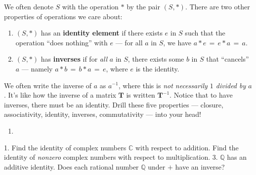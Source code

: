 \documentclass[11pt]{article}
\newcommand{\mat}[1]{\mathbf{#1}}
\begin{document}
We often denote $S$ with the operation $\ast$ by the pair $(S, \ast)$. There are two other properties of operations we care about:
\begin{enumerate}
  \item $(S, \ast)$ has an \textbf{identity element} if there exists $e$ in $S$ such that the operation ``does nothing'' with $e$ --- for all $a$ in $S$, we have $a \ast e \, = \, e \ast a \, = \, a$.
  \item $(S, \ast)$ has \textbf{inverses} if for \textit{all} $a$ in $S$, there exists some $b$ in $S$ that ``cancels'' $a$ --- namely $a \ast b \, = \, b \ast a \, = \, e$, where $e$ is the identity. 
\end{enumerate}
We often write the inverse of $a$ as $a^{-1}$, where this is \textit{not necessarily $1$ divided by $a$}. It's like how the inverse of a matrix $\mat{T}$ is written $\mat{T}^{-1}$. Notice that to have inverses, there must be an identity. Drill these five properties --- closure, associativity, identity, inverses, commutativity --- into your head! 

\begin{enumerate}
  \item 
\end{enumerate}

1. Find the identity of complex numbers $\mathbb{C}$ with respect to addition. Find the identity of \textit{nonzero} complex numbers with respect to multiplication.
3. $\mathbb{Q}$ has an additive identity. Does each rational number $\mathbb{Q}$ under $+$ have an inverse?
\end{document}
